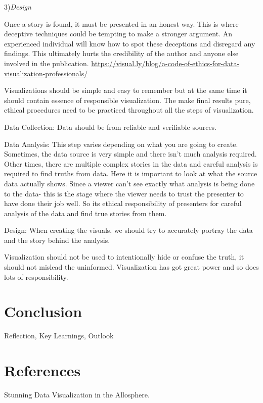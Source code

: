 \documentclass[]{book}
\theoremstyle{definition}
\theoremstyle{definition}
\theoremstyle{definition}
\theoremstyle{remark}
\begin{document}
3)\emph{Design}

Once a story is found, it must be presented in an honest way. This is
where deceptive techniques could be tempting to make a stronger
argument. An experienced individual will know how to spot these
deceptions and disregard any findings. This ultimately hurts the
credibility of the author and anyone else involved in the publication.
\url{https://visual.ly/blog/a-code-of-ethics-for-data-visualization-professionals/}

Visualizations should be simple and easy to remember but at the same
time it should contain essence of responsible visualization. The make
final results pure, ethical procedures need to be practiced throughout
all the steps of visualization.

Data Collection: Data should be from reliable and verifiable sources.

Data Analysis: This step varies depending on what you are going to
create. Sometimes, the data source is very simple and there isn't much
analysis required. Other times, there are multiple complex stories in
the data and careful analysis is required to find truths from data. Here
it is important to look at what the source data actually shows. Since a
viewer can't see exactly what analysis is being done to the data- this
is the stage where the viewer needs to trust the presenter to have done
their job well. So its ethical responsibility of presenters for careful
analysis of the data and find true stories from them.

Design: When creating the visuals, we should try to accurately portray
the data and the story behind the analysis.

Visualization should not be used to intentionally hide or confuse the
truth, it should not mislead the uninformed. Visualization has got great
power and so does lots of responsibility.

\chapter{Conclusion}\label{conclusion}

Reflection, Key Learnings, Outlook

\chapter*{References}\label{references-1}

Stunning Data Visualization in the Allosphere.
\end{document}
